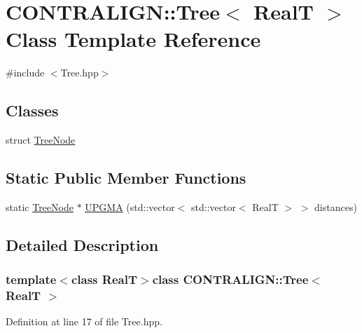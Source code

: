 \hypertarget{class_c_o_n_t_r_a_l_i_g_n_1_1_tree}{\section{C\+O\+N\+T\+R\+A\+L\+I\+G\+N\+:\+:Tree$<$ Real\+T $>$ Class Template Reference}
\label{class_c_o_n_t_r_a_l_i_g_n_1_1_tree}
}


{\ttfamily \#include $<$Tree.\+hpp$>$}

\subsection*{Classes}
\begin{DoxyCompactItemize}
\item 
struct \hyperlink{struct_c_o_n_t_r_a_l_i_g_n_1_1_tree_1_1_tree_node}{Tree\+Node}
\end{DoxyCompactItemize}
\subsection*{Static Public Member Functions}
\begin{DoxyCompactItemize}
\item 
static \hyperlink{struct_c_o_n_t_r_a_l_i_g_n_1_1_tree_1_1_tree_node}{Tree\+Node} $\ast$ \hyperlink{class_c_o_n_t_r_a_l_i_g_n_1_1_tree_a5f1d99bbdc00ecf83740039ccb24bcda}{U\+P\+G\+M\+A} (std\+::vector$<$ std\+::vector$<$ Real\+T $>$ $>$ distances)
\end{DoxyCompactItemize}


\subsection{Detailed Description}
\subsubsection*{template$<$class Real\+T$>$class C\+O\+N\+T\+R\+A\+L\+I\+G\+N\+::\+Tree$<$ Real\+T $>$}



Definition at line 17 of file Tree.\+hpp.



